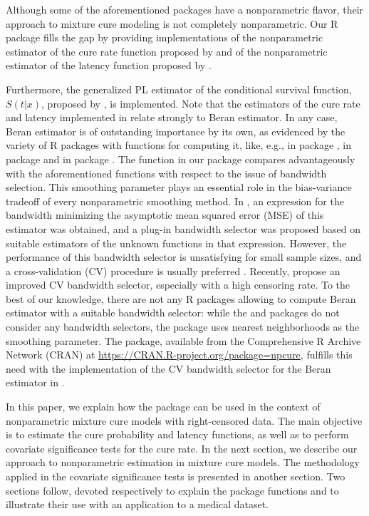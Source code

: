 Although some of the aforementioned packages have a nonparametric flavor, their approach to mixture cure modeling is not completely nonparametric. Our R package  \citep{LopezUllibarri} fills the gap by providing implementations of the nonparametric estimator of the cure rate function proposed by \citet{Xu} \citep[further studied by][]{Lopez1} and of the nonparametric estimator of the latency function proposed by \citet{Lopez2}. 

Furthermore, the generalized PL estimator of the conditional survival function, $S\left(t|x\right)$, proposed by \cite{Beran}, is implemented. Note that the estimators of the cure rate and latency implemented in  relate strongly to Beran estimator. In any case, Beran estimator is of outstanding importance by its own, as evidenced by the variety of R packages with functions for computing it, like, e.g.,  in package  \citep{MeiraMachado1},  in package  \citep{Gerds} and  in package  \citep{MeiraMachado2}. The function in our package compares advantageously with the aforementioned functions with respect to the issue of bandwidth selection. This smoothing parameter plays an essential role in the bias-variance tradeoff of every nonparametric smoothing method. In \cite{Dabrowska}, an expression for the bandwidth minimizing the asymptotic mean squared error (MSE) of this estimator was obtained, and a plug-in bandwidth selector was proposed based on suitable estimators of the unknown functions in that expression. However, the performance of this bandwidth selector is unsatisfying for small sample sizes, and a cross-validation (CV) procedure is usually preferred \citep[see][among others]{Iglesias, Gannoun}. Recently, \cite{Geerdens} propose an improved CV bandwidth selector, especially with a high censoring rate. To the best of our knowledge, there are not any R packages allowing to compute Beran estimator with a suitable bandwidth selector: while the  and  packages do not consider any bandwidth selectors, the  package uses nearest neighborhoods as the smoothing parameter. The  package, available from the Comprehensive R Archive Network (CRAN) at \url{https://CRAN.R-project.org/package=npcure}, fulfills this need with the implementation of the CV bandwidth selector for the Beran estimator in \cite{Geerdens}.

In this paper, we explain how the  package can be used in the context of nonparametric mixture cure models with right-censored data. The main objective is to estimate the cure probability and latency functions, as well as to perform covariate significance tests for the cure rate. In the next section, we describe our approach to nonparametric estimation in mixture cure models. The methodology applied in the covariate significance tests is presented in another section. Two sections follow, devoted respectively to explain the package functions and to illustrate their use with an application to a medical dataset.


